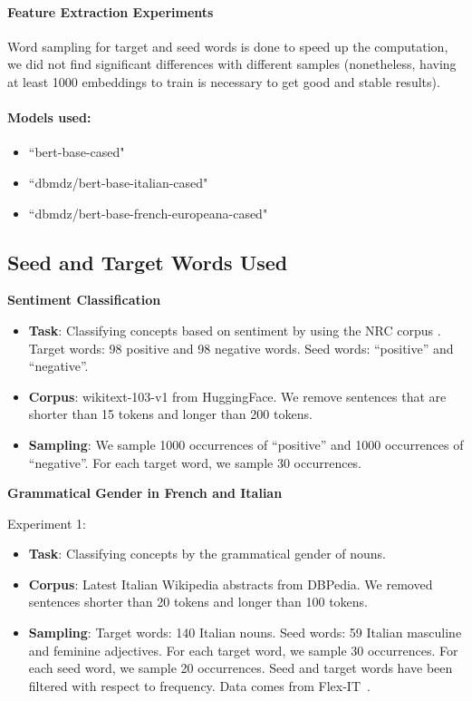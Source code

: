 \paragraph{Feature Extraction Experiments}
Word sampling for target and seed words is done to speed up the computation, we did not find significant differences with different samples (nonetheless, having at least 1000 embeddings to train \wc is necessary to get good and stable results).

\paragraph{Models used:}
\begin{itemize}
    \item ``bert-base-cased"
    \item ``dbmdz/bert-base-italian-cased"
    \item ``dbmdz/bert-base-french-europeana-cased"
\end{itemize}

\subsection{Seed and Target Words Used}
\label{sec:seeds}
\textbf{Sentiment Classification} 
\begin{itemize}
    \item  \textbf{Task}: Classifying concepts based on sentiment by using the NRC corpus \cite{mohammad-etal-2013-nrc}. Target words: 98 positive and 98 negative words. Seed words: ``positive'' and ``negative''.
    \item \textbf{Corpus}: wikitext-103-v1 from HuggingFace. We remove sentences that are shorter than 15 tokens and longer than 200 tokens.
    \item \textbf{Sampling}: We sample 1000 occurrences of ``positive'' and 1000 occurrences of ``negative''. For each target word, we sample 30 occurrences.
\end{itemize}
    

\textbf{Grammatical Gender in French and Italian} 

Experiment 1: 
\begin{itemize}
    \item \textbf{Task}: Classifying 
concepts by the grammatical gender of nouns. 
\item \textbf{Corpus}: Latest Italian Wikipedia abstracts from DBPedia. We removed sentences shorter than 20 tokens and longer than 100 tokens.
\item \textbf{Sampling}: Target words: 140 Italian nouns. Seed words: 59 Italian masculine and feminine adjectives. For each target word, we sample 30 occurrences. For each seed word, we sample 20 occurrences. Seed and target words have been filtered with respect to frequency. Data comes from Flex-IT~\cite{pescuma2021form}.
\end{itemize}


